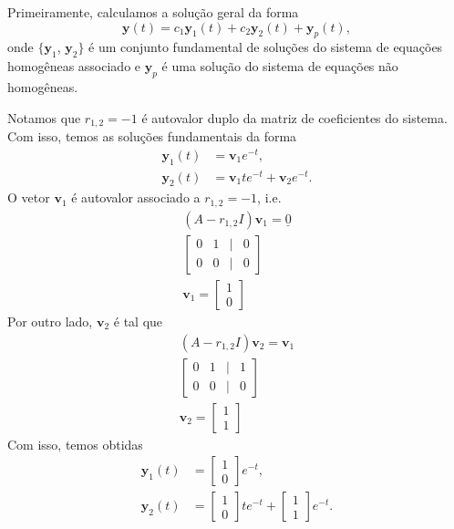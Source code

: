 \begin{resol}
  Primeiramente, calculamos a solução geral da forma
  \begin{equation}
    \pmb{y}(t) = c_1\pmb{y}_1(t) + c_2\pmb{y}_2(t) + \pmb{y}_p(t),
  \end{equation}
  onde $\{\pmb{y}_1$, $\pmb{y}_2\}$ é um conjunto fundamental de soluções do sistema de equações homogêneas associado e $\pmb{y}_p$ é uma solução do sistema de equações não homogêneas.

  Notamos que $r_{1,2} = -1$ é autovalor duplo da matriz de coeficientes do sistema. Com isso, temos as soluções fundamentais da forma
  \begin{align}
    \pmb{y}_1(t) &= \pmb{v}_1e^{-t}, \\
    \pmb{y}_2(t) &= \pmb{v}_1te^{-t} + \pmb{v}_2e^{-t}.
  \end{align}
  O vetor $\pmb{v}_1$ é autovalor associado a $r_{1,2}=-1$, i.e.
  \begin{gather}
    (A-r_{1,2}I)\pmb{v}_1 = \underline{0} \\
    \begin{bmatrix}
      0 & 1 & | & 0 \\
      0 & 0 & | & 0
    \end{bmatrix}\\
    \pmb{v}_1 =
    \begin{bmatrix}
      1\\
      0
    \end{bmatrix}
  \end{gather}
  Por outro lado, $\pmb{v}_2$ é tal que
  \begin{gather}
    (A-r_{1,2}I)\pmb{v}_2 = \pmb{v}_1 \\
    \begin{bmatrix}
      0 & 1 & | & 1 \\
      0 & 0 & | & 0
    \end{bmatrix}\\
    \pmb{v}_2 =
    \begin{bmatrix}
      1\\
      1
    \end{bmatrix}
  \end{gather}
  Com isso, temos obtidas
  \begin{align}
    \pmb{y}_1(t) &=
    \begin{bmatrix}
      1 \\ 0
    \end{bmatrix}e^{-t}, \\
    \pmb{y}_2(t) &=
    \begin{bmatrix}
      1 \\
      0
    \end{bmatrix}te^{-t} +
    \begin{bmatrix}
      1 \\ 1
    \end{bmatrix}e^{-t}.
  \end{align}


\end{resol}
